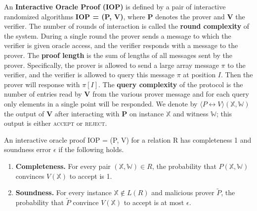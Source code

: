 \begin{definition}
An \textbf{Interactive Oracle Proof (IOP)} is defined by a pair of interactive randomized
algorithms \textbf{IOP = (P, V)}, where \textbf{P} denotes the prover and \textbf{V} the verifier. 
The number of rounds of interaction is called the \textbf{round complexity} of the system. 
During a single round the prover sends a message to which the verifier is given oracle access, and the verifier responds with a message to the prover. 
The \textbf{proof length} is the sum of lengths of all messages sent by the prover. Specifically, the prover is allowed to send a large array message $\pi$ to the verifier, and the verifier is allowed to query this message $\pi$ at position $I$. Then the prover will response with $\pi[I]$.
The \textbf{query complexity} of the protocol is the number of entries read by \textbf{V} from the various prover message and for each query only elements in a single point will be responded.
We denote by $\langle P \leftrightarrow V \rangle (\mathbb{X}, \mathbb{W})$ the output of \textbf{V} after interacting with \textbf{P} on instance $\mathbb{X}$ and witness $\mathbb{W}$; this output is either \textsc{accept} or \textsc{reject}.

An interactive oracle proof IOP = (P, V) for a relation R has completeness 1 and soundness error $\epsilon$ if the following holds.

\begin{enumerate}
    \item \textbf{Completeness.}
    For every pair $(\mathbb{X}, \mathbb{W}) \in R$, the probability that $P(\mathbb{X}, \mathbb{W})$ convinces $V(\mathbb{X})$ to accept is 1.
    
    \item \textbf{Soundness.}
    For every instance $\mathbb{X} \not\in L(R)$ and malicious prover $\tilde{P}$, the probability that $\tilde{P}$ convince $V(\mathbb{X})$ to accept is at most $\epsilon$.
\end{enumerate}
\end{definition}

